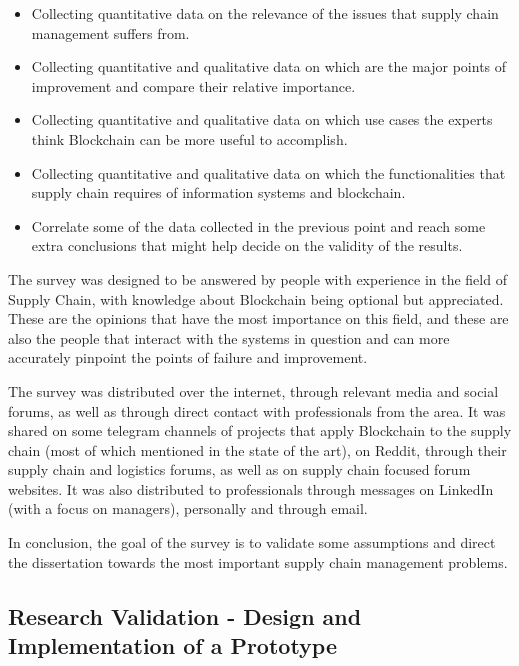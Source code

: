 \begin{itemize}
\item Collecting quantitative data on the relevance of the issues that supply chain management suffers from.
\item Collecting quantitative and qualitative data on which are the major points of improvement and compare their relative importance.
\item Collecting quantitative and qualitative data on which use cases the experts think Blockchain can be more useful to accomplish.
\item Collecting quantitative and qualitative data on which the functionalities that supply chain requires of information systems and blockchain.
\item Correlate some of the data collected in the previous point and reach some extra conclusions that might help decide on the validity of the results.
\end{itemize}

The survey was designed to be answered by people with experience in the field of Supply Chain, with knowledge about Blockchain being optional but appreciated. These are the opinions that have the most importance on this field, and these are also the people that interact with the systems in question and can more accurately pinpoint the points of failure and improvement.

The survey was distributed over the internet, through relevant media and social forums, as well as through direct contact with professionals from the area. It was shared on some telegram channels of projects that apply Blockchain to the supply chain (most of which mentioned in the state of the art), on Reddit, through their supply chain and logistics forums, as well as on supply chain focused forum websites. It was also distributed to professionals through messages on LinkedIn (with a focus on managers), personally and through email.

In conclusion, the goal of the survey is to validate some assumptions and direct the dissertation towards the most important supply chain management problems.

\subsection{Research Validation - Design and Implementation of a Prototype}

